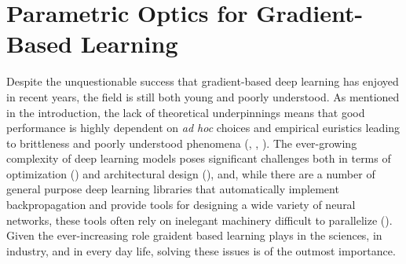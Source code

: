 \documentclass[11pt,a4paper,openright,twoside]{report}
\theoremstyle{plain}
\theoremstyle{definition}
\begin{document}
\tableofcontents
\rhead[\fancyplain{}{\bfseries\leftmark}]{\fancyplain{}{\bfseries\thepage}} 
\clearpage{\pagestyle{empty}\cleardoublepage}

























































\chapter{Parametric Optics for Gradient-Based Learning}

\lhead[\fancyplain{}{\bfseries\thepage}]{\fancyplain{}{\bfseries\rightmark}}




Despite the unquestionable success that gradient-based deep learning has enjoyed in recent years, the field is still both young and poorly understood. As mentioned in the introduction, the lack of theoretical underpinnings means that good performance is highly dependent on \textit{ad hoc} choices and empirical euristics leading to brittleness and poorly understood phenomena (\cite{cruttwell2022categorical}, \cite{shiebler2021category}, \cite{gavranovic2024fundamental}). The ever-growing complexity of deep learning models poses significant challenges both in terms of optimization (\cite{elliott2018simple}) and architectural design (\cite{gavranovicposition}), and, while there are a number of general purpose deep learning libraries that automatically implement backpropagation and provide tools for designing a wide variety of neural networks, these tools often rely on inelegant machinery difficult to parallelize (\cite{elliott2018simple}). Given the ever-increasing role graident based learning plays in the sciences, in industry, and in every day life, solving these issues is of the outmost importance. 
\end{document}
